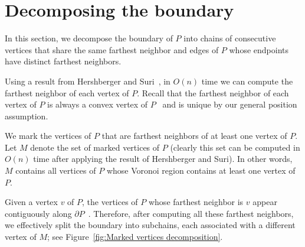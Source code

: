 \documentclass[a4paper,UKenglish]{lipics}
\begin{document}
\section{Decomposing the boundary}\label{Section:Decomposing the boundary}
In this section, we decompose the boundary of $P$ into chains of consecutive vertices that share the same farthest neighbor and edges of $P$ whose endpoints have distinct farthest neighbors.

Using a result from Hershberger and Suri~\cite{hershberger1993matrix}, in $O(n)$ time we can compute the farthest neighbor of each vertex of $P$.
Recall that the farthest neighbor of each vertex of $P$ is always a convex vertex of $P$~\cite{at-cgcsp-85} and is unique by our general position assumption. 

We mark the vertices of $P$ that are farthest neighbors of at least one vertex of $P$. Let $M$ denote the set of marked vertices of $P$ (clearly this set can be computed in $O(n)$ time after applying the result of Hershberger and Suri).
In other words, $M$ contains all vertices of $P$ whose Voronoi region contains at least one vertex of $P$.

Given a vertex $v$ of $P$, the vertices of $P$ whose farthest neighbor is $v$ appear contiguously along $\partial P$~\cite{aronov1993furthest}. Therefore, after computing all these farthest neighbors, we effectively split the boundary into subchains, each associated with a different vertex of $M$; see Figure~\ref{fig:Marked vertices decomposition}.
\end{document}
